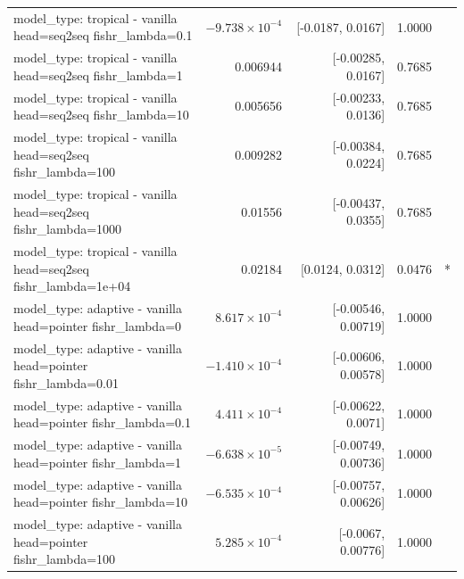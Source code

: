 \documentclass[10pt]{article}
\makeatletter
\newcommand{\stackcell}[1]{\begin{tabular}[t]{@{}l@{}}#1\end{tabular}}
\makeatother
\begin{document}
{\begin{longtable}{lrrrl}
\stackcell{model\_type: tropical - vanilla\\\footnotesize head=seq2seq fishr\_lambda=0.1 } & $-9.738\times10^{-4}$ & [-0.0187, 0.0167] & 1.0000 & \\
\stackcell{model\_type: tropical - vanilla\\\footnotesize head=seq2seq fishr\_lambda=1 } & 0.006944 & [-0.00285, 0.0167] & 0.7685 & \\
\stackcell{model\_type: tropical - vanilla\\\footnotesize head=seq2seq fishr\_lambda=10 } & 0.005656 & [-0.00233, 0.0136] & 0.7685 & \\
\stackcell{model\_type: tropical - vanilla\\\footnotesize head=seq2seq fishr\_lambda=100 } & 0.009282 & [-0.00384, 0.0224] & 0.7685 & \\
\stackcell{model\_type: tropical - vanilla\\\footnotesize head=seq2seq fishr\_lambda=1000 } & 0.01556 & [-0.00437, 0.0355] & 0.7685 & \\
\stackcell{model\_type: tropical - vanilla\\\footnotesize head=seq2seq fishr\_lambda=1e+04 } & 0.02184 & [0.0124, 0.0312] & 0.0476 & *\\
\stackcell{model\_type: adaptive - vanilla\\\footnotesize head=pointer fishr\_lambda=0 } & $8.617\times10^{-4}$ & [-0.00546, 0.00719] & 1.0000 & \\
\stackcell{model\_type: adaptive - vanilla\\\footnotesize head=pointer fishr\_lambda=0.01 } & $-1.410\times10^{-4}$ & [-0.00606, 0.00578] & 1.0000 & \\
\stackcell{model\_type: adaptive - vanilla\\\footnotesize head=pointer fishr\_lambda=0.1 } & $4.411\times10^{-4}$ & [-0.00622, 0.0071] & 1.0000 & \\
\stackcell{model\_type: adaptive - vanilla\\\footnotesize head=pointer fishr\_lambda=1 } & $-6.638\times10^{-5}$ & [-0.00749, 0.00736] & 1.0000 & \\
\stackcell{model\_type: adaptive - vanilla\\\footnotesize head=pointer fishr\_lambda=10 } & $-6.535\times10^{-4}$ & [-0.00757, 0.00626] & 1.0000 & \\
\stackcell{model\_type: adaptive - vanilla\\\footnotesize head=pointer fishr\_lambda=100 } & $5.285\times10^{-4}$ & [-0.0067, 0.00776] & 1.0000 & \\

\end{longtable}}
\end{document}
